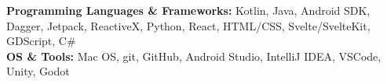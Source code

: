 

\begin{cvparagraph}
\textbf{Programming Languages \& Frameworks:} Kotlin, Java, Android SDK, Dagger, Jetpack, ReactiveX, Python, React, HTML/CSS, Svelte/SvelteKit, GDScript, C\#
\\[2pt]
\textbf{OS \& Tools:} Mac OS, git, GitHub, Android Studio, IntelliJ IDEA, VSCode, Unity, Godot


\end{cvparagraph}
